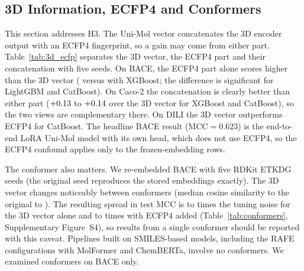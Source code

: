 \documentclass[pdflatex,sn-mathphys-num,Numbered]{sn-jnl}%
\begin{document}
\subsection{3D Information, ECFP4 and Conformers}\label{sec:3d_ecfp}
This section addresses H3. The Uni-Mol vector concatenates the 3D encoder output with an ECFP4 fingerprint, so a gain may come from either part. Table~\ref{tab:3d_ecfp} separates the 3D vector, the ECFP4 part and their concatenation with five seeds. On BACE, the ECFP4 part alone scores higher than the 3D vector (\ecfpbace{} versus \threedbace{} with XGBoost; the difference is significant for LightGBM and CatBoost). On Caco-2 the concatenation is clearly better than either part ($+0.13$ to $+0.14$ over the 3D vector for XGBoost and CatBoost), so the two views are complementary there. On DILI the 3D vector outperforms ECFP4 for CatBoost. The headline BACE result (MCC$=0.623$) is the end-to-end LoRA Uni-Mol model with its own head, which does not use ECFP4, so the ECFP4 confound applies only to the frozen-embedding rows.

The conformer also matters. We re-embedded BACE with five RDKit ETKDG seeds (the original seed reproduces the stored embeddings exactly). The 3D vector changes noticeably between conformers (median cosine similarity to the original \coslo{} to \coshi{}). The resulting spread in test MCC is \rthreedlo{} to \rthreedhi{} times the tuning noise for the 3D vector alone and \rcatlo{} to \rcathi{} times with ECFP4 added (Table~\ref{tab:conformers}, Supplementary Figure~S4), so results from a single conformer should be reported with this caveat. Pipelines built on SMILES-based models, including the RAFE configurations with MolFormer and ChemBERTa, involve no conformers. We examined conformers on BACE only.

\begin{table}[!ht]
\centering
\caption{3D versus ECFP4 within the Uni-Mol vector (XGBoost, five seeds; MCC, and Spearman for Caco-2).}
\label{tab:3d_ecfp}
\scriptsize

\end{table}

\begin{table}[!ht]
\centering
\caption{Conformer-seed sensitivity on BACE (five conformer seeds times three tree seeds).}
\label{tab:conformers}
\small

\end{table}

\FloatBarrier
\end{document}
